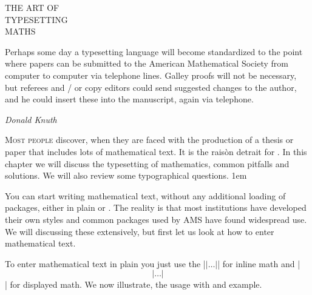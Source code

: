 \thispagestyle{empty}
    \begin{leftcolumn}
         {{\centering \huge  THE ART OF \\
       TYPESETTING\\
       MATHS\\}}
      \medskip
       {\justifying \small Perhaps some day a typesetting language will become standardized to the 
point where papers can be submitted to the American Mathematical Society 
from computer to computer via telephone lines. Galley proofs will not be 
necessary, but referees  and / or copy editors could send suggested changes to 
the author, and he could insert these into the manuscript, again via telephone.\par
\hfill \textit{Donald Knuth}}
\medskip
       \par
   \end{leftcolumn}
   \begin{rightcolumn}

     \vspace*{1.5\baselineskip}

  \centerline{}
      \begin{multicols}{2}
      \small
      \lettrine{M}{ost people} discover, \alltex when they are faced with the production of a thesis or paper that includes lots of
mathematical text. It is the rais\`on detrait for \tex. In this chapter we will discuss the typesetting of mathematics, common pitfalls and solutions. We will also review some typographical questions.
\parindent1em

You can start writing mathematical text, without any additional loading of packages, either in plain \tex or \latex. The reality is that most institutions have developed their own styles and common packages used by AMS have found widespread use. We will discussing these extensively, but first let us look at how to enter mathematical text. 

To enter mathematical text in plain \tex you just use the |$|\ldots|$| for inline math and |$$|\ldots|$$| for displayed math. We now illustrate, the usage with and example.
      \end{multicols}
   \end{rightcolumn}
\stoptemplate


